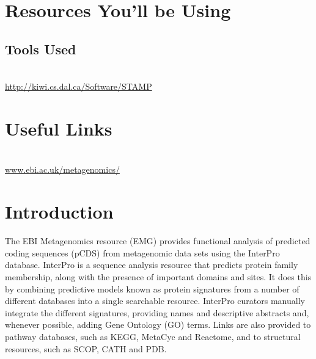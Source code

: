 \section{Resources You'll be Using}
 
\subsection{Tools Used}
\begin{description}[style=multiline,labelindent=0cm,align=left,leftmargin=0.5cm]
  \item[STAMP]\hfill\\
  	\url{http://kiwi.cs.dal.ca/Software/STAMP}
\end{description}

\section{Useful Links}
 
\begin{description}[style=multiline,labelindent=0cm,align=left,leftmargin=0.5cm]
  \item[EBI Metagenomics resource (EMG)]\hfill\\
    \url{www.ebi.ac.uk/metagenomics/}
\end{description}

\newpage

\section{Introduction}

\begin{note}
The EBI Metagenomics resource (EMG) provides functional analysis of predicted coding sequences (pCDS) from metagenomic data sets using the InterPro database. InterPro is a sequence analysis resource that predicts protein family membership, along with the presence of important domains and sites. It does this by combining predictive models known as protein signatures from a number of different databases into a single searchable resource. InterPro curators manually integrate the different signatures, providing names and descriptive abstracts and, whenever possible, adding Gene Ontology (GO) terms. Links are also provided to pathway databases, such as KEGG, MetaCyc and Reactome, and to structural resources, such as SCOP, CATH and PDB.
\end{note}
